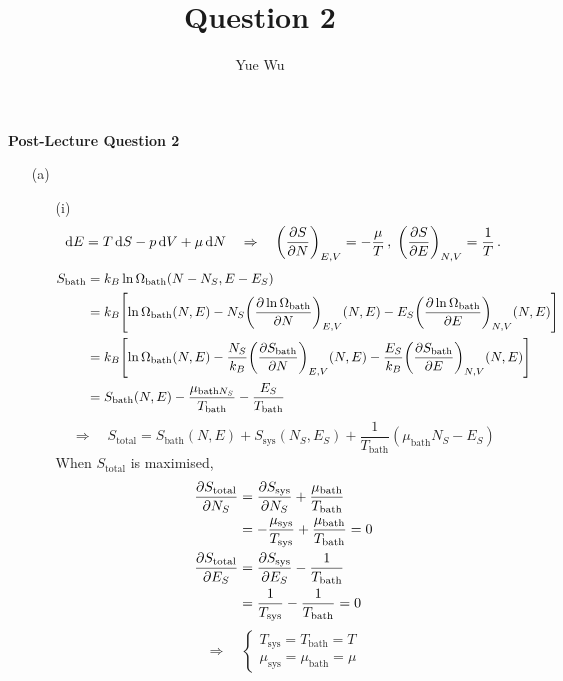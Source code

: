 \documentclass{article}
\title{Question 2}
\author{Yue Wu}
\begin{document}
    \begin{center}
        \LARGE\textbf{Post-Lecture Question 2}
    \end{center}

    \begin{enumerate}
        \item[(a)]
        \begin{enumerate}
            \item[(i)]
            $$\dd{E}=T\dd{S}-p\dd{V}+\mu\dd{N}\quad\Rightarrow\quad\qty(\pdv{S}{N})_{E,V}=-\frac{\mu}{T}\,,\;\qty(\pdv{S}{E})_{N,V}=\frac{1}{T}\,.$$
            \begin{align*}
                S_{\text{bath}}&=k_B\ln\Omega_{\text{bath}}(N-N_S,E-E_S)\\
                &=k_B\qty[\ln\Omega_{\text{bath}}(N,E)-N_S\qty(\pdv{\ln\Omega_{\text{bath}}}{N})_{E,V}(N,E)-E_S\qty(\pdv{\ln\Omega_{\text{bath}}}{E})_{N,V}(N,E)]\\
                &=k_B\qty[\ln\Omega_{\text{bath}}(N,E)-\frac{N_S}{k_B}\qty(\pdv{S_{\text{bath}}}{N})_{E,V}(N,E)-\frac{E_S}{k_B}\qty(\pdv{S_{\text{bath}}}{E})_{N,V}(N,E)]\\
                &=S_{\text{bath}}(N,E)-\frac{\mu_{\text{bath}N_S}}{T_{\text{bath}}}-\frac{E_S}{T_{\text{bath}}}
            \end{align*}
            $$\Rightarrow\quad S_{\text{total}}=S_{\text{bath}}(N,E)+S_{\text{sys}}(N_S,E_S)+\frac{1}{T_{\text{bath}}}(\mu_{\text{bath}}N_S-E_S)$$
            When $S_{\text{total}}$ is maximised,
            \begin{align*}
                \pdv{S_{\text{total}}}{N_S}&=\pdv{S_{\text{sys}}}{N_S}(N_S,E_S)+\frac{\mu_{\text{bath}}}{T_{\text{bath}}}\\
                &=-\frac{\mu_{\text{sys}}}{T_{\text{sys}}}+\frac{\mu_{\text{bath}}}{T_{\text{bath}}}=0\\
                \pdv{S_{\text{total}}}{E_S}&=\pdv{S_{\text{sys}}}{E_S}(N_S,E_S)-\frac{1}{T_{\text{bath}}}\\
                &=\frac{1}{T_{\text{sys}}}-\frac{1}{T_{\text{bath}}}=0\\
            \end{align*}
            $$\Rightarrow\quad\left\{\begin{aligned}
                T_\text{sys}=T_\text{bath}=T\\
                \mu_\text{sys}=\mu_\text{bath}=\mu
            \end{aligned}\right.$$
            \begin{align*}

\end{align*}
\end{enumerate}
\end{enumerate}
\end{document}
